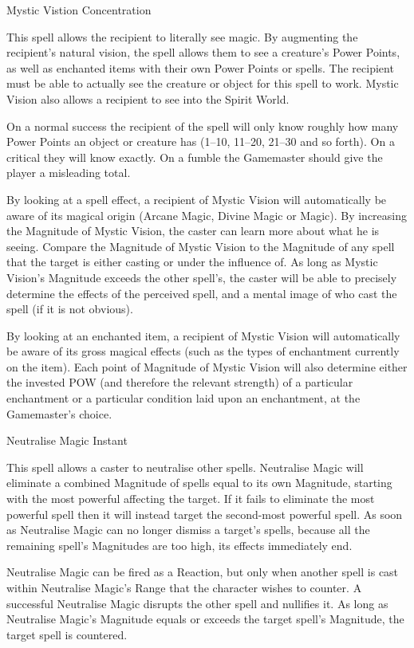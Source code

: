 \begin{rpg-spell}
{Mystic Vistion}
{Concentration}

This spell allows the recipient to literally see magic. By augmenting the recipient’s natural vision, the spell allows them to see a creature’s Power Points, as well as enchanted items with their own Power Points or spells. The recipient must be able to actually see the creature or object for this spell to work. Mystic Vision also allows a recipient to see into the Spirit World.

On a normal success the recipient of the spell will only know roughly how many Power Points an object or creature has (1–10, 11–20, 21–30 and so forth). On a critical they will know exactly. On a fumble the Gamemaster should give the player a misleading total.

By looking at a spell effect, a recipient of Mystic Vision will automatically be aware of its magical origin (Arcane Magic, Divine Magic or Magic). By increasing the Magnitude of Mystic Vision, the caster can learn more about what he is seeing. Compare the Magnitude of Mystic Vision to the Magnitude of any spell that the target is either casting or under the influence of. As long as Mystic Vision’s Magnitude exceeds the other spell’s, the caster will be able to precisely determine the effects of the perceived spell, and a mental image of who cast the spell (if it is not obvious). 

By looking at an enchanted item, a recipient of Mystic Vision will automatically be aware of its gross magical effects (such as the types of enchantment currently on the item). Each point of Magnitude of Mystic Vision will also determine either the invested POW (and therefore the relevant strength) of a particular enchantment or a particular condition laid upon an enchantment, at the Gamemaster’s choice.
\end{rpg-spell}


\begin{rpg-spell}
{Neutralise Magic}
{Instant}

This spell allows a caster to neutralise other spells. Neutralise Magic will eliminate a combined Magnitude of spells equal to its own Magnitude, starting with the most powerful affecting the target. If it fails to eliminate the most powerful spell then it will instead target the second-most powerful spell. As soon as Neutralise Magic can no longer dismiss a target’s spells, because all the remaining spell’s Magnitudes are too high, its effects immediately end. 

Neutralise Magic can be fired as a Reaction, but only when another spell is cast within Neutralise Magic’s Range that the character wishes to counter. A successful Neutralise Magic disrupts the other spell and nullifies it. As long as Neutralise Magic’s Magnitude equals or exceeds the target spell’s Magnitude, the target spell is countered. 
\end{rpg-spell}

